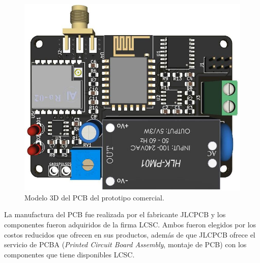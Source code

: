 \begin{figure}[h]
	\centering
	\includegraphics[scale=0.375	]{./Figures/pcb_3d.jpg}
	\caption{Modelo 3D del PCB del prototipo comercial.}
		\label{fig:cuadradoAzul}
\end{figure}

La manufactura del PCB fue realizada por el fabricante JLCPCB y los componentes fueron adquiridos de la firma LCSC. Ambos fueron elegidos por los costos reducidos que ofrecen en sus productos, además de que JLCPCB ofrece el servicio de PCBA (\textit{Printed Circuit Board Assembly}, montaje de PCB) con los componentes que tiene disponibles LCSC.